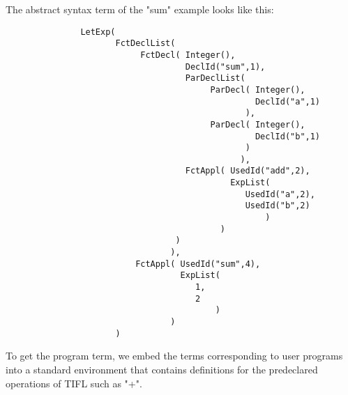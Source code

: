 \pagebreak
\noindent
The abstract syntax term of the "sum" example looks like this:
\begin{verbatim}
               LetExp(
                      FctDeclList(
                           FctDecl( Integer(),
                                    DeclId("sum",1),
                                    ParDeclList(
                                         ParDecl( Integer(),
                                                  DeclId("a",1)
                                                ),
                                         ParDecl( Integer(),
                                                  DeclId("b",1)
                                                ) 
                                               ),
                                    FctAppl( UsedId("add",2),
                                             ExpList( 
                                                UsedId("a",2),
                                                UsedId("b",2)
                                                    )
                                           ) 
                                  )
                                 ), 
                          FctAppl( UsedId("sum",4),
                                   ExpList(
                                      1,
                                      2
                                          )
                                 )
                      )

\end{verbatim}
To get the program term, we embed the terms corresponding to 
user programs into a standard environment that contains definitions
for the predeclared operations of TIFL such as "+".


